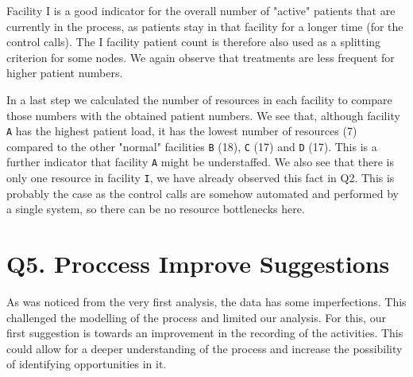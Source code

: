 \documentclass[12pt]{report}
\begin{document}
Facility I is a good indicator for the overall number of "active" patients that are currently in the process, as patients stay in that facility for a longer time (for the control calls). The I facility patient count is therefore also used as a splitting criterion for some nodes. We again observe that treatments are less frequent for higher patient numbers.

In a last step we calculated the number of resources in each facility to compare those numbers with the obtained patient numbers. We see that, although facility \texttt{A} has the highest patient load, it has the lowest number of resources (7) compared to the other "normal" facilities \texttt{B} (18), \texttt{C} (17) and \texttt{D} (17). This is a further indicator that facility \texttt{A} might be understaffed. We also see that there is only one resource in facility \texttt{I}, we have already observed this fact in Q2. This is probably the case as the control calls are somehow automated and performed by a single system, so there can be no resource bottlenecks here.

\section{Q5. Proccess Improve Suggestions}

As was noticed from the very first analysis, the data has some imperfections. This challenged the modelling of the process and limited our analysis. For this, our first suggestion is towards an improvement in the recording of the activities. This could allow for a deeper understanding of the process and increase the possibility of identifying opportunities in it.
\end{document}
